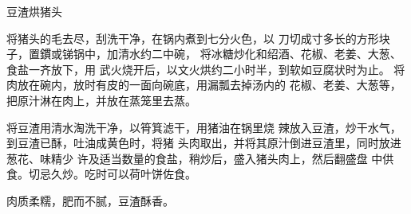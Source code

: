 \begin{recipe}{豆渣烘猪头}

\ingredients



\cooking

将猪头的毛去尽，刮洗干净，在锅内煮到七分火色，以 刀切成寸多长的方形块子，置鏆或锑锅中，加清水约二中碗， 将冰糖炒化和绍酒、花椒、老姜、大葱、食盐一齐放下，用 武火烧开后，以文火烘约二小时半，到软如豆腐状时为止。 将肉放在碗内，放时有皮的一面向碗底，用漏瓢去掉汤内的 花椒、老姜、大葱等，把原汁淋在肉上，并放在蒸笼里去蒸。

将豆渣用清水淘洗干净，以筲箕滤干，用猪油在锅里烧 辣放入豆渣，炒干水气，到豆渣已酥，吐油成黄色时，将猪 头肉取出，并将其原汁倒进豆渣里，同时放进葱花、味精少 许及适当数量的食盐，稍炒后，盛入猪头肉上，然后翻盛盘 中供食。切忌久炒。吃时可以荷叶饼佐食。

\notes

肉质柔糯，肥而不腻，豆渣酥香。

\end{recipe}

